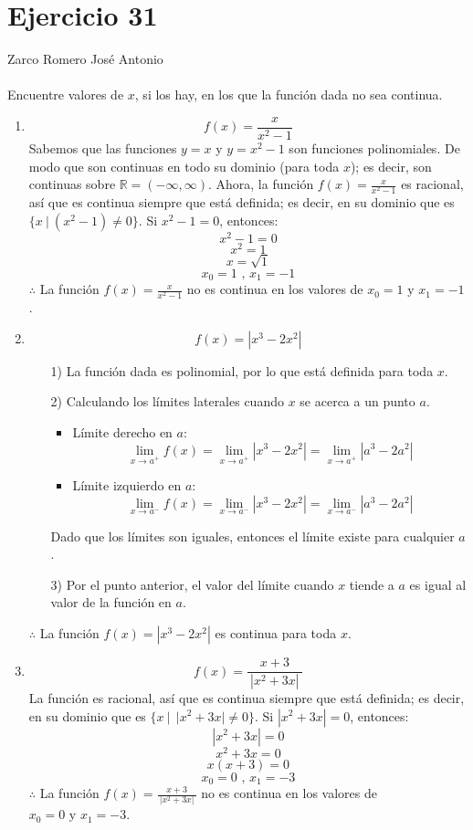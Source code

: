 \documentclass[12pt]{article}
\begin{document}
\section{Ejercicio 31}
Zarco Romero José Antonio\\
\\
Encuentre valores de $x$, si los hay, en los que la función dada no sea continua.
\begin{enumerate}[label=(\alph*)]
\item \[ f(x)=\frac{x}{x^2-1} \]
Sabemos que las funciones $y=x$ y $y=x^2-1$ son funciones polinomiales. De modo que son continuas en todo su dominio (para toda $x$); es decir, son continuas sobre $\mathbb R=(-\infty,\infty)$. Ahora, la función $f(x)=\frac{x}{x^2-1}$ es racional, así que es continua siempre que está definida; es decir, en su dominio que es $\{ x ~|~ (x^2-1) \neq 0 \}$. Si $x^2-1=0$, entonces:
\[
x^2-1=0
\]
\[
x^2=1
\]
\[
x=\sqrt{1}
\]
\[
x_0=1 \text{ , } x_1=-1
\]
$\therefore$ La función $f(x)=\frac{x}{x^2-1}$ no es continua en los valores de $x_0=1 \text{ y } x_1=-1$.

\item \[ f(x)= | x^3-2x^2 | \]
\begin{enumerate}
	\item[1)] La función dada es polinomial, por lo que está definida para toda $x$.
	\item[2)] Calculando los límites laterales cuando $x$ se acerca a un punto $a$.
	\begin{itemize}
		\item Límite derecho en $a$:
		\[ 
		\lim_{x \to a^+}f(x) = \lim_{x \to a^+}| x^3-2x^2 | =\lim_{x \to a^+}| a^3-2a^2 |
		\]
		\item Límite izquierdo en $a$:
		\[ 
		\lim_{x \to a^-}f(x) = \lim_{x \to a^-}| x^3-2x^2 | =\lim_{x \to a^-}| a^3-2a^2 |
		\]
	\end{itemize}
	Dado que los límites son iguales, entonces el límite existe para cualquier $a$.
	\item[3)] Por el punto anterior, el valor del límite cuando $x$ tiende a $a$ es igual al valor de la función en $a$.
\end{enumerate}
$\therefore$ La función $f(x)= |x^3-2x^2 |$ es continua para toda $x$.

\item \[ f(x)=\frac{x+3}{~|x^2+3x|~} \]
La función es racional, así que es continua siempre que está definida; es decir, en su dominio que es $\{ x ~|~ ~|x^2+3x|\neq 0 \}$. Si $|x^2+3x|=0$, entonces:
\[
|x^2+3x|=0
\]
\[
x^2+3x=0
\]
\[
x(x+3)=0
\]
\[
x_0=0 \text{ , } x_1=-3
\]
$\therefore$ La función $f(x)=\frac{x+3}{~|x^2+3x|~}$ no es continua en los valores de $x_0=0 \text{ y } x_1=-3$.
\end{enumerate}
\end{document}
